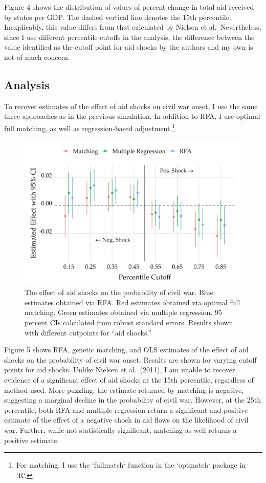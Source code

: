 \documentclass[11pt,]{article}
\begin{document}
Figure 4 shows the distribution of values of percent change in total aid
received by states per GDP. The dashed vertical line denotes the
15\(\text{th}\) percentile. Inexplicably, this value differs from that
calculated by Nielsen et al.~Nevertheless, since I use different
percentile cutoffs in the analysis, the difference between the value
identified as the cutoff point for aid shocks by the authors and my own
is not of much concern.

\hypertarget{analysis-1}{%
\subsection{Analysis}\label{analysis-1}}

To recover estimates of the effect of aid shocks on civil war onset, I
use the same three approaches as in the previous simulation. In addition
to RFA, I use optimal full matching, as well as regression-based
adjustment.\footnote{For matching, I use the `fullmatch` function in the `optmatch` package in `R`.}

\begin{figure}
\centering
\includegraphics{allcoef.png}
\caption{The effect of aid shocks on the probability of civil war. Blue
estimates obtained via RFA. Red estimates obtained via optimal full
matching. Green estimates obtained via multiple regression. 95 percent
CIs calculated from robust standard errors. Results shown with different
cutpoints for ``aid shocks.''}
\end{figure}

Figure 5 shows RFA, genetic matching, and OLS estimates of the effect of
aid shocks on the probability of civil war onset. Results are shown for
varying cutoff points for aid shocks. Unlike Nielsen et al.~(2011), I am
unable to recover evidence of a significant effect of aid shocks at the
15\(\text{th}\) percentile, regardless of method used. More puzzling,
the estimate returned by matching is negative, suggesting a marginal
decline in the probability of civil war. However, at the 25\(\text{th}\)
percentile, both RFA and multiple regression return a significant and
positive estimate of the effect of a negative shock in aid flows on the
likelihood of civil war. Further, while not statistically significant,
matching as well returns a positive estimate.
\end{document}
